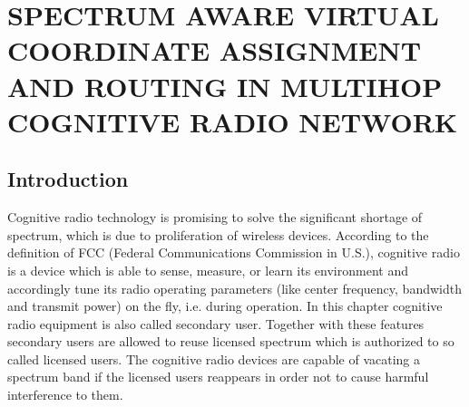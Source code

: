 \chapter{SPECTRUM AWARE VIRTUAL COORDINATE ASSIGNMENT AND ROUTING IN MULTIHOP COGNITIVE RADIO NETWORK}
%
%



\section{Introduction}
\label{introduction}
Cognitive radio technology is promising to solve the significant shortage of spectrum, which is due to proliferation of wireless devices.
According to the definition of FCC (Federal Communications Commission in U.S.), cognitive radio is a device which is able to sense, measure, or learn its environment and accordingly tune its radio operating parameters (like center frequency, bandwidth and transmit power) on the fly, i.e. during operation. 
In this chapter cognitive radio equipment is also called secondary user.
Together with these features secondary users are allowed to reuse licensed spectrum which is authorized to so called licensed users.
The cognitive radio devices are capable of vacating a spectrum band if the licensed users reappears in order not to cause harmful interference to them.

